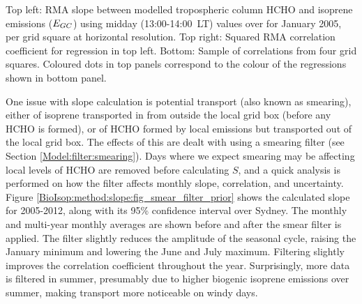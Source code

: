     { %
      Top left: RMA slope between modelled tropospheric column HCHO and isoprene emissions ($E_{GC}$) using midday (13:00-14:00~LT) values over for January 2005, per grid square at \lowhr horizontal resolution.
      Top right: Squared RMA correlation coefficient for regression in top left. 
      Bottom: Sample of correlations from four grid squares.
      Coloured dots in top panels correspond to the colour of the regressions shown in bottom panel.
    }
    {\label{BioIsop:method:slope:fig_regressions}}
    
    
    One issue with slope calculation is potential transport (also known as smearing), either of isoprene transported in from outside the local grid box (before any HCHO is formed), or of HCHO formed by local emissions but transported out of the local grid box.
    The effects of this are dealt with using a smearing filter (see Section \ref{Model:filter:smearing}).
    Days where we expect smearing may be affecting local levels of HCHO are removed before calculating $S$, and a quick analysis is performed on how the filter affects monthly slope, correlation, and uncertainty.
    Figure \ref{BioIsop:method:slope:fig_smear_filter_prior} shows the calculated slope for 2005-2012, along with its 95\% confidence interval over Sydney.
    The monthly and multi-year monthly averages are shown before and after the smear filter is applied.
    The filter slightly reduces the amplitude of the seasonal cycle, raising the January minimum and lowering the June and July maximum.
    Filtering slightly improves the correlation coefficient throughout the year.
    Surprisingly, more data is filtered in summer, presumably due to higher biogenic isoprene emissions over summer, making transport more noticeable on windy days.
